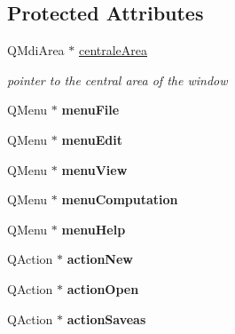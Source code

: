 \subsection*{\-Protected \-Attributes}
\begin{DoxyCompactItemize}
\item 
\hypertarget{class_main_window_af5df9378db57a148236d639dd928d08f}{\-Q\-Mdi\-Area $\ast$ \hyperlink{class_main_window_af5df9378db57a148236d639dd928d08f}{centrale\-Area}}\label{class_main_window_af5df9378db57a148236d639dd928d08f}

\begin{DoxyCompactList}\small\item\em pointer to the central area of the window \end{DoxyCompactList}\item 
\hypertarget{class_main_window_a2ca04227e7d71b036ccd0ed4176a5561}{\-Q\-Menu $\ast$ {\bfseries menu\-File}}\label{class_main_window_a2ca04227e7d71b036ccd0ed4176a5561}

\item 
\hypertarget{class_main_window_a51ec7fcfcb60073b395dee46daacf1f9}{\-Q\-Menu $\ast$ {\bfseries menu\-Edit}}\label{class_main_window_a51ec7fcfcb60073b395dee46daacf1f9}

\item 
\hypertarget{class_main_window_a57793b17cc2b8de42b5b10e9458ae9cb}{\-Q\-Menu $\ast$ {\bfseries menu\-View}}\label{class_main_window_a57793b17cc2b8de42b5b10e9458ae9cb}

\item 
\hypertarget{class_main_window_a8142152915924723cee2f22e0868a852}{\-Q\-Menu $\ast$ {\bfseries menu\-Computation}}\label{class_main_window_a8142152915924723cee2f22e0868a852}

\item 
\hypertarget{class_main_window_a81d80bba8e8a31cea2bb218094890c81}{\-Q\-Menu $\ast$ {\bfseries menu\-Help}}\label{class_main_window_a81d80bba8e8a31cea2bb218094890c81}

\item 
\hypertarget{class_main_window_afcc4de380e40fe4aeb61b07402f00f58}{\-Q\-Action $\ast$ {\bfseries action\-New}}\label{class_main_window_afcc4de380e40fe4aeb61b07402f00f58}

\item 
\hypertarget{class_main_window_ab5342d85523e2dad5b6f69a6ad01ece3}{\-Q\-Action $\ast$ {\bfseries action\-Open}}\label{class_main_window_ab5342d85523e2dad5b6f69a6ad01ece3}

\item 
\hypertarget{class_main_window_ac785bdaae348156fc94fdfea23f67a90}{\-Q\-Action $\ast$ {\bfseries action\-Saveas}}\label{class_main_window_ac785bdaae348156fc94fdfea23f67a90}


\end{DoxyCompactItemize}
